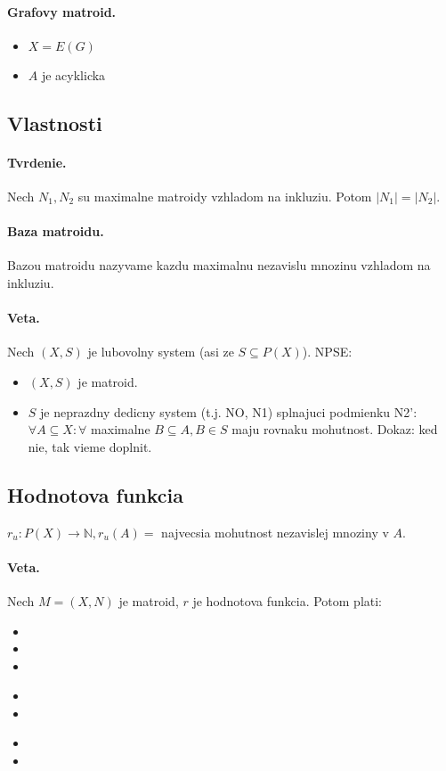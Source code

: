 \documentclass[10pt,a4paper]{article}
\begin{document}
\paragraph{Grafovy matroid.}
\begin{itemize}
\item $X = E(G)$
\item $A$ je acyklicka
\end{itemize}

\subsection{Vlastnosti} 
\paragraph{Tvrdenie.} Nech $N_1, N_2$ su maximalne matroidy vzhladom na inkluziu. Potom $|N_1|=|N_2|$. 

\paragraph{Baza matroidu.} Bazou matroidu nazyvame kazdu maximalnu nezavislu mnozinu vzhladom na inkluziu. 


\paragraph{Veta.} Nech $(X, S)$ je lubovolny system (asi ze $S \subseteq P(X)$). NPSE: 
\begin{itemize}
\item $(X,S)$ je matroid. 
\item $S$ je neprazdny dedicny system (t.j. NO, N1) splnajuci podmienku N2': $\forall A \subseteq X : \forall $ maximalne $B \subseteq A, B \in S$ maju rovnaku mohutnost. Dokaz: ked nie, tak vieme doplnit. 
\end{itemize}

\subsection{Hodnotova funkcia} 
$r_u : P(X) \rightarrow \mathbb{N}, r_u(A) = $ najvecsia mohutnost nezavislej mnoziny v $A$. 

\paragraph{Veta.} Nech $M=(X,N)$ je matroid, $r$ je hodnotova funkcia. Potom plati: 
\begin{itemize}
\item 
\item
\item
\end{itemize}

\begin{itemize}
\item
\item
\end{itemize}

\begin{itemize}
\item
\item
\end{itemize}
\end{document}

